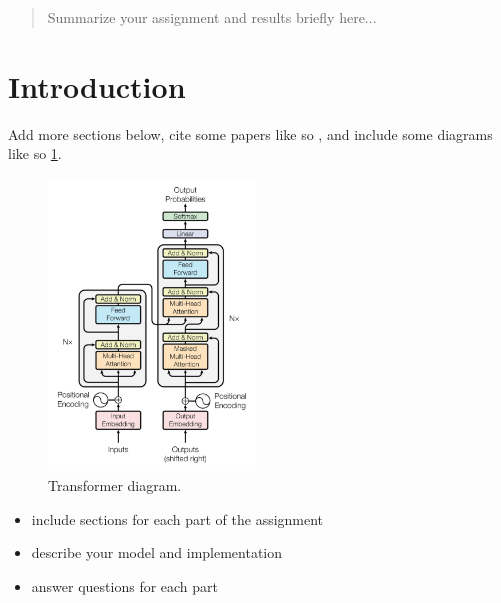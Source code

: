 \documentclass{article}
\theoremstyle{definition}
\theoremstyle{remark}
\begin{document}

\printAffiliationsAndNotice{\icmlEqualContribution}





\begin{abstract}
   Summarize your assignment and results briefly here... 
\end{abstract}




\section{Introduction}

Add more sections below, cite some papers like so \cite{vaswani2017attention}, and include some diagrams like so \ref{transformer}.

\begin{figure}[!h]
	\centering
	\includegraphics[width=0.49\textwidth]{img/transformer.png}
	\caption{Transformer diagram.}
	\label{transformer}
\end{figure}

\begin{itemize}
	\item include sections for each part of the assignment
    \item describe your model and implementation
    \item answer questions for each part
\end{itemize}


\end{document}

